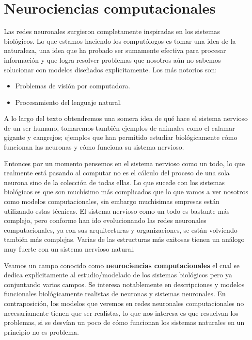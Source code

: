 \section{Neurociencias computacionales}

Las redes neuronales surgieron completamente inspiradas en los sistemas biológicos. 
Lo que estamos haciendo los computólogos es tomar una idea de la naturaleza, una idea que ha probado ser sumamente efectiva para procesar información y que logra resolver problemas que nosotros aún no sabemos solucionar con modelos diseñados explícitamente.
Los más notorios son: 
\begin{itemize}
\item Problemas de visión por computadora.
\item Procesamiento del lenguaje natural.
\end{itemize}

A lo largo del texto obtendremos una somera idea de qué hace el sistema nervioso de un ser humano, tomaremos también ejemplos de animales como el calamar gigante y cangrejos; ejemplos que han permitido estudiar biológicamente cómo funcionan las neuronas y cómo funciona su sistema nervioso. 

Entonces por un momento pensemos en el sistema nervioso como un todo, lo que realmente está pasando al computar no es el cálculo del proceso  de una sola neurona sino de la colección de todas ellas. Lo que sucede con los sistemas biológicos es que son muchísimo más complicados que lo que vamos a ver nosotros como modelos computacionales, sin embargo muchísimas empresas están utilizando estas técnicas. 
El sistema nervioso como un todo es bastante más complejo, pero conforme han ido evolucionando las redes neuronales computacionales, ya con sus arquitecturas y organizaciones, se están volviendo también más complejas. Varias de las estructuras más exitosas tienen un análogo muy fuerte con un sistema nervioso natural. 

Veamos un campo conocido como \textbf{neurociencias computacionales} el cual se dedica explícitamente al estudio/modelado de los sistemas biológicos pero ya conjuntando varios campos. Se interesa notablemente en descripciones y modelos funcionales biológicamente realistas de neuronas y sistemas neuronales. En contraposición, los modelos que veremos en redes neuronales computacionales no necesariamente tienen que ser realistas, lo que nos interesa es que resuelvan los problemas, si se desvían un poco de cómo funcionan los sistemas naturales en un principio no es problema. 


